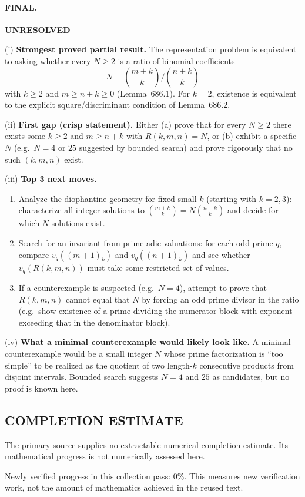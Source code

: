 \paragraph{FINAL.}
\noindent\textbf{UNRESOLVED}

\smallskip
\noindent(i) \textbf{Strongest proved partial result.}
The representation problem is equivalent to asking whether every $N\ge 2$ is a ratio of binomial coefficients
\[
N=\binom{m+k}{k}\big/\binom{n+k}{k}
\]
with $k\ge 2$ and $m\ge n+k\ge 0$ (Lemma~686.1). For $k=2$, existence is equivalent to the explicit square/discriminant condition
of Lemma~686.2.

\smallskip
\noindent(ii) \textbf{First gap (crisp statement).}
Either (a) prove that for every $N\ge 2$ there exists some $k\ge 2$ and $m\ge n+k$ with $R(k,m,n)=N$, or
(b) exhibit a specific $N$ (e.g.\ $N=4$ or $25$ suggested by bounded search) and prove rigorously that no such $(k,m,n)$ exist.

\smallskip
\noindent(iii) \textbf{Top 3 next moves.}
\begin{enumerate}
\item Analyze the diophantine geometry for fixed small $k$ (starting with $k=2,3$): characterize all integer solutions to
$\binom{m+k}{k}=N\binom{n+k}{k}$ and decide for which $N$ solutions exist.
\item Search for an invariant from prime-adic valuations: for each odd prime $q$, compare $v_q((m+1)_k)$ and $v_q((n+1)_k)$ and see
whether $v_q(R(k,m,n))$ must take some restricted set of values.
\item If a counterexample is suspected (e.g.\ $N=4$), attempt to prove that $R(k,m,n)$ cannot equal that $N$ by forcing an odd prime divisor
in the ratio (e.g.\ show existence of a prime dividing the numerator block with exponent exceeding that in the denominator block).
\end{enumerate}

\smallskip
\noindent(iv) \textbf{What a minimal counterexample would likely look like.}
A minimal counterexample would be a small integer $N$ whose prime factorization is ``too simple'' to be realized as the quotient of two
length-$k$ consecutive products from disjoint intervals. Bounded search suggests $N=4$ and $25$ as candidates, but no proof is known here.




\subsection*{COMPLETION ESTIMATE}
The primary source supplies no extractable numerical completion estimate. Its mathematical progress is not numerically assessed here.

Newly verified progress in this collection pass: $0\%$. This measures new verification work, not the amount of mathematics achieved in the reused text.
